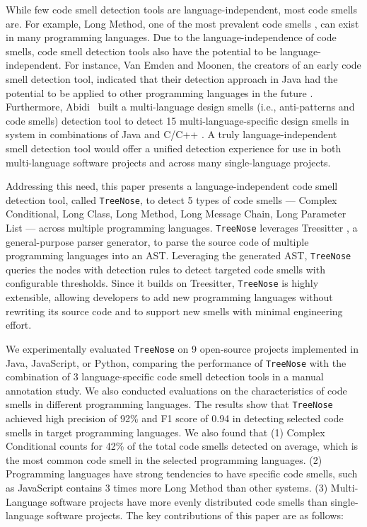 While few code smell detection tools are language-independent, most code smells
are. For example, Long Method, one of the most prevalent code smells
\cite{developersCare}, can exist in many programming languages. Due to the
language-independence of code smells, code smell detection tools also have the
potential to be language-independent. For instance, Van Emden and Moonen, the
creators of an early code smell detection tool, indicated that their detection
approach in Java had the potential to be applied to other programming languages
in the future \cite{1173068}. Furthermore, Abidi~\etal{} built a multi-language
design smells (i.e., anti-patterns and code smells) detection tool to detect 15
multi-language-specific design smells in system in combinations of Java and
C/C++ \cite{MultiLanguageCodeSmells,Fault-Prone}. A truly language-independent
smell detection tool would offer a unified detection experience for use in both
multi-language software projects and across many single-language projects.


Addressing this need, this paper presents a language-independent code smell
detection tool, called \texttt{TreeNose}, to detect 5 types of code smells ---
Complex Conditional, Long Class, Long Method, Long Message Chain, Long Parameter
List --- across multiple programming languages. \texttt{TreeNose} leverages
Treesitter \cite{treeSitter}, a general-purpose parser generator, to parse the
source code of multiple programming languages into an AST. Leveraging the
generated AST, \texttt{TreeNose} queries the nodes with detection rules to
detect targeted code smells with configurable thresholds. Since it builds on
Treesitter, \texttt{TreeNose} is highly extensible, allowing developers to add
new programming languages without rewriting its source code and to support new
smells with minimal engineering effort.


We experimentally evaluated \texttt{TreeNose} on
9 open-source projects implemented in Java, JavaScript, or Python, comparing
the performance of \texttt{TreeNose} with the combination of 3 language-specific
code smell detection tools in a manual annotation study. We also conducted
evaluations on the characteristics of code smells in different programming
languages.
%
%
The results show that \texttt{TreeNose} achieved high precision of 92\% and F1
score of 0.94 in detecting selected code smells in target programming languages.
We also found that (1) Complex Conditional counts for 42\% of the total code
smells detected on average, which is the most common code smell in the selected
programming languages. (2) Programming languages have strong tendencies to have
specific code smells, such as JavaScript contains 3 times more Long Method than
other systems. (3) Multi-Language software projects have more evenly distributed
code smells than single-language software projects.
%
%
The key contributions of this paper are as follows:

